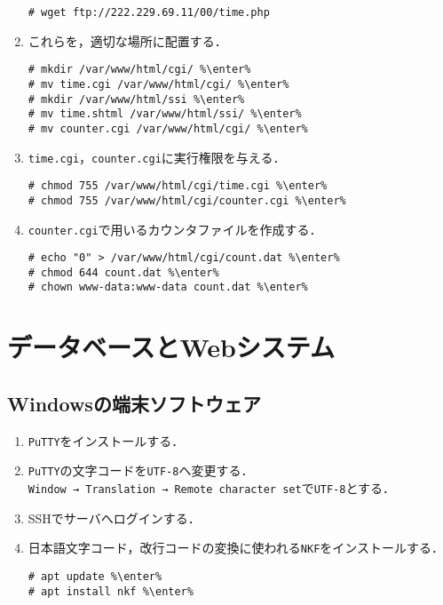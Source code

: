 \documentclass{jlreq}
\begin{document}
\begin{enumerate}
\begin{lstlisting}
# wget ftp://222.229.69.11/00/time.php
\end{lstlisting}
    \item これらを，適切な場所に配置する．
          \begin{lstlisting}
# mkdir /var/www/html/cgi/ %\enter%
# mv time.cgi /var/www/html/cgi/ %\enter%
# mkdir /var/www/html/ssi %\enter%
# mv time.shtml /var/www/html/ssi/ %\enter%
# mv counter.cgi /var/www/html/cgi/ %\enter%
\end{lstlisting}
    \item \texttt{time.cgi}，\texttt{counter.cgi}に実行権限を与える．
          \begin{lstlisting}
# chmod 755 /var/www/html/cgi/time.cgi %\enter%
# chmod 755 /var/www/html/cgi/counter.cgi %\enter%
\end{lstlisting}
    \item \texttt{counter.cgi}で用いるカウンタファイルを作成する．
          \begin{lstlisting}
# echo "0" > /var/www/html/cgi/count.dat %\enter%
# chmod 644 count.dat %\enter%
# chown www-data:www-data count.dat %\enter%
\end{lstlisting}
\end{enumerate}
\section{データベースとWebシステム}
\subsection{Windowsの端末ソフトウェア}
\begin{enumerate}
    \item \texttt{PuTTY}をインストールする．
    \item \texttt{PuTTY}の文字コードを\texttt{UTF-8}へ変更する．\\
          \texttt{Window → Translation → Remote character set}で\texttt{UTF-8}とする．
    \item SSHでサーバへログインする．
    \item 日本語文字コード，改行コードの変換に使われる\texttt{NKF}をインストールする．
          \begin{lstlisting}
# apt update %\enter%
# apt install nkf %\enter%
\end{lstlisting}
\end{enumerate}
\end{document}
